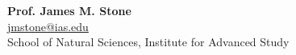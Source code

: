 \documentclass[12pt]{article}
\begin{document}








{{\bf Prof. James M. Stone} \\
\url{jmstone@ias.edu}\\
School of Natural Sciences, Institute for Advanced Study}
\end{document}
